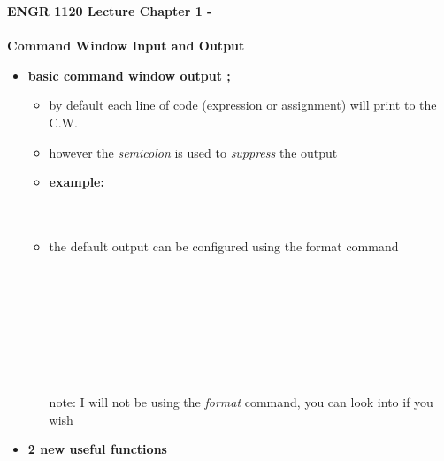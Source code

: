 \documentclass[11pt]{article}
\newcommand{\NUM}{1 }
\begin{document}
\textbf{ \LARGE ENGR 1120 Lecture Chapter \NUM - \\\\ Command Window Input and Output} \\

\begin{itemize}

	\item \textbf{ \LARGE basic command window output ;}\\
		\Large
		\begin{itemize}
			\item by default each line of code (expression or assignment) will print to the C.W. \\ \vspace{20mm}
			\item however the {\it semicolon} is used to {\it suppress} the output\\ 
			\item {\bf example:} \\
			
				 \\\\
				
			\item the default output can be configured using the format command\\
		
				  \\\\
				  \\\\
				  \\\\
				  \\\\
					
			note: I will not be using the {\it format} command, you can look into if you wish\\		
		\end{itemize}
		
		\newpage
	\item \textbf{ \LARGE 2 new useful functions}\\
	
		
		\begin{itemize}
		

\end{itemize}
\end{itemize}
\end{document}
